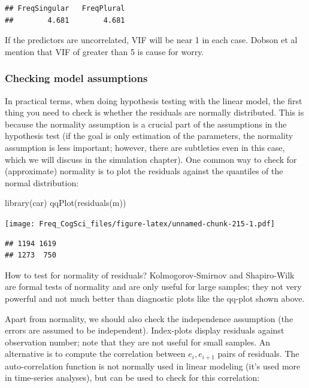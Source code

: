 \documentclass[
  12pt,
]{krantz}
\newenvironment{Shaded}{\begin{snugshade}}{\end{snugshade}}
\newcommand{\FunctionTok}[1]{\textcolor[rgb]{0.00,0.00,0.00}{#1}}
\newcommand{\NormalTok}[1]{#1}
\theoremstyle{definition}
\theoremstyle{definition}
\theoremstyle{definition}
\theoremstyle{definition}
\theoremstyle{remark}
\begin{document}
\begin{verbatim}
## FreqSingular   FreqPlural 
##        4.681        4.681
\end{verbatim}

If the predictors are uncorrelated, VIF will be near 1 in each case. Dobson et al mention that VIF of greater than 5 is cause for worry.

\hypertarget{checking-model-assumptions-1}{%
\subsubsection{Checking model assumptions}\label{checking-model-assumptions-1}}

In practical terms, when doing hypothesis testing with the linear model, the first thing you need to check is whether
the residuals are normally distributed. This is because the normality assumption is a crucial part of the assumptions in the hypothesis test (if the goal is only estimation of the parameters, the normality assumption is less important; however, there are subtleties even in this case, which we will discuss in the simulation chapter).
One common way to check for (approximate) normality is to plot the residuals against the quantiles of the normal distribution:

\begin{Shaded}
\begin{Highlighting}[]
\FunctionTok{library}\NormalTok{(car)}
\FunctionTok{qqPlot}\NormalTok{(}\FunctionTok{residuals}\NormalTok{(m))}
\end{Highlighting}
\end{Shaded}

\texttt{[image: Freq\_CogSci\_files/figure-latex/unnamed-chunk-215-1.pdf]}

\begin{verbatim}
## 1194 1619 
## 1273  750
\end{verbatim}

How to test for normality of residuals?
Kolmogorov-Smirnov and Shapiro-Wilk are formal tests of normality and are only useful for large samples; they not very powerful and not much better than diagnostic plots like the qq-plot shown above.

Apart from normality, we should also check the independence assumption (the errors are assumed to be independent). Index-plots display residuals against observation number; note that they are not useful for small samples. An alternative is to compute the correlation between \(e_i, e_{i+1}\) pairs of residuals. The auto-correlation function is not normally used in linear modeling (it's used more in time-series analyses), but can be used to check for this correlation:
\end{document}

